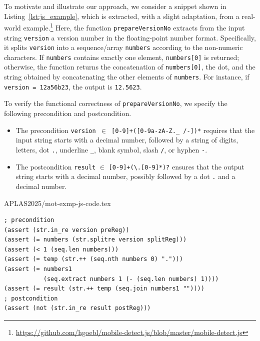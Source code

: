 
To motivate and illustrate our approach, we consider a  snippet shown in Listing~\ref{lst:js_example}, which is extracted, with a slight adaptation, from a real-world example.\footnote{\url{https://github.com/hgoebl/mobile-detect.js/blob/master/mobile-detect.js}}
Here, the function \texttt{prepareVersionNo} extracts from the input string \texttt{version} a version number in the floating-point number format. 
Specifically, it splits  \texttt{version}  into a sequence/array {\tt numbers} according to the non-numeric characters. If {\tt numbers} contains exactly one element, {\tt numbers[0]} is returned; otherwise, the function returns the concatenation of {\tt numbers[0]}, the dot, and the string obtained by concatenating the other elements of {\tt numbers}.  For instance, if {\tt version = 12a56b23}, the output %
is {\tt 12.5623}.

To verify the functional correctness of  \texttt{prepareVersionNo}, we specify the following precondition and postcondition.  
\begin{itemize}[topsep=0pt,partopsep=0pt]
\item The precondition {\tt version $\in$ \verb|[0-9]+([0-9a-zA-Z._ /-])*|} requires that the input string starts with a decimal number, followed by a string of digits, letters, dot \verb|.|, underline  \verb|_|, blank symbol, slash \verb|/|, or hyphen \verb|-|.
\item The postcondition {\tt result} $\in$ \verb|[0-9]+(\.[0-9]*)?| ensures that the output string starts with a decimal number, possibly followed by a dot \verb|.| and a decimal number. 
\end{itemize}
 

{APLAS2025/mot-exmp-js-code.tex}  



\begin{lstlisting}[float=t,language=SMT-LIB, caption={SMT formula for path-2 in {\tt prepareVersionNo}}, label={lst:js_example_constraints},belowskip=-2\baselineskip,aboveskip=-0.8\baselineskip]
; precondition 
(assert (str.in_re version preReg)) 
(assert (= numbers (str.splitre version splitReg)))
(assert (< 1 (seq.len numbers)))
(assert (= temp (str.++ (seq.nth numbers 0) ".")))
(assert (= numbers1
           (seq.extract numbers 1 (- (seq.len numbers) 1))))
(assert (= result (str.++ temp (seq.join numbers1 ""))))
; postcondition
(assert (not (str.in_re result postReg))) 
\end{lstlisting} 

